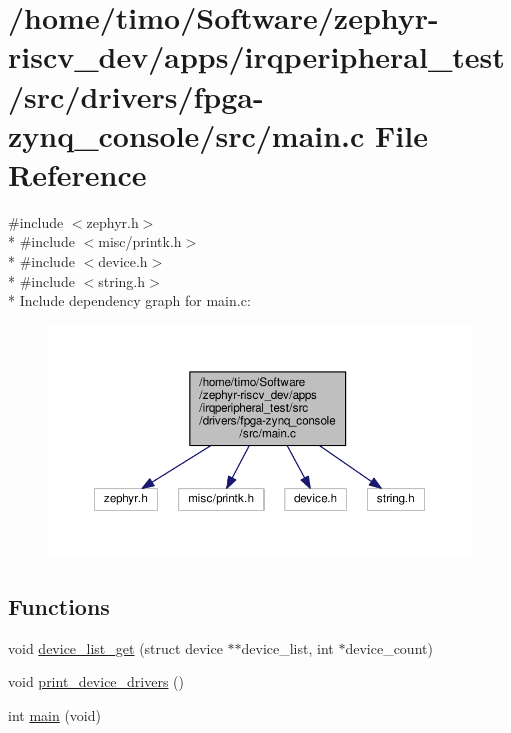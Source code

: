 \hypertarget{drivers_2fpga-zynq__console_2src_2main_8c}{}\section{/home/timo/\+Software/zephyr-\/riscv\+\_\+dev/apps/irqperipheral\+\_\+test/src/drivers/fpga-\/zynq\+\_\+console/src/main.c File Reference}
\label{drivers_2fpga-zynq__console_2src_2main_8c}
{\ttfamily \#include $<$zephyr.\+h$>$}\\*
{\ttfamily \#include $<$misc/printk.\+h$>$}\\*
{\ttfamily \#include $<$device.\+h$>$}\\*
{\ttfamily \#include $<$string.\+h$>$}\\*
Include dependency graph for main.\+c\+:\nopagebreak
\begin{figure}[H]
\begin{center}
\leavevmode
\includegraphics[width=350pt]{drivers_2fpga-zynq__console_2src_2main_8c__incl}
\end{center}
\end{figure}
\subsection*{Functions}
\begin{DoxyCompactItemize}
\item 
void \hyperlink{drivers_2fpga-zynq__console_2src_2main_8c_a42ee756b94eb5db2d5cd4d4c4bd73cee}{device\+\_\+list\+\_\+get} (struct device $\ast$$\ast$device\+\_\+list, int $\ast$device\+\_\+count)
\item 
void \hyperlink{drivers_2fpga-zynq__console_2src_2main_8c_addac945d30228d08bf924de4f324d15e}{print\+\_\+device\+\_\+drivers} ()
\item 
int \hyperlink{drivers_2fpga-zynq__console_2src_2main_8c_a840291bc02cba5474a4cb46a9b9566fe}{main} (void)
\end{DoxyCompactItemize}
